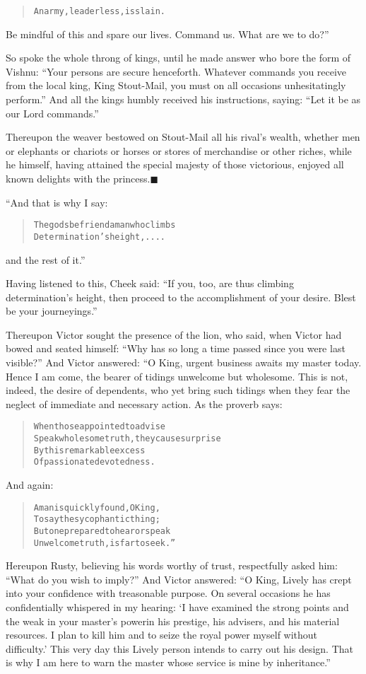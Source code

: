 \documentclass[article, twoside, 14pt]{memoir}
\newcommand{\qed}{\hfill \ensuremath{\blacksquare}}
\renewenvironment{verbatim}{%
\begin{quote}%
\vskip -10pt%
\begin{alltt}\normalfont\large}{\end{alltt}%
\end{quote}%
\vskip -10pt
} %
\begin{document}
\begin{verbatim}
An army, leaderless, is slain.
\end{verbatim}
Be mindful of this and spare our lives. Command us. What are we to
do?”

So spoke the whole throng of kings, until he made answer who bore
the form of Vishnu:
``Your persons are secure henceforth. Whatever commands you receive from the local king, King Stout-Mail, you must on all occasions unhesitatingly perform.''
And all the kings humbly received his instructions, saying:
``Let it be as our Lord commands.''

Thereupon the weaver bestowed on Stout-Mail all his rival's wealth,
whether men or elephants or chariots or horses or stores of
merchandise or other riches, while he himself, having attained the
special majesty of those victorious, enjoyed all known delights
with the princess.\hyperref[s11]{\qed}

“And that is why I say:

\begin{verbatim}
The gods befriend a man who climbs
    Determination's height, ....
\end{verbatim}
and the rest of it.”

Having listened to this, Cheek said:
``If you, too, are thus climbing determination's height, then proceed to the accomplishment of your desire. Blest be your journeyings.''

Thereupon Victor sought the presence of the lion, who said, when
Victor had bowed and seated himself:
``Why has so long a time passed since you were last visible?'' And
Victor answered: “O King, urgent business awaits my master today.
Hence I am come, the bearer of tidings unwelcome but wholesome.
This is not, indeed, the desire of dependents, who yet bring such
tidings when they fear the neglect of immediate and necessary
action. As the proverb says:

\begin{verbatim}
When those appointed to advise
Speak wholesome truth, they cause surprise
By this remarkable excess
Of passionate devotedness.
\end{verbatim}
And again:

\begin{verbatim}
A man is quickly found, O King,
To say the sycophantic thing;
But one prepared to hear or speak
Unwelcome truth, is far to seek.”
\end{verbatim}
Hereupon Rusty, believing his words worthy of trust, respectfully
asked him: ``What do you wish to imply?'' And Victor answered:
``O King, Lively has crept into your confidence with treasonable purpose. On several occasions he has confidentially whispered in my hearing: `I have examined the strong points and the weak in your master's power{\textemdash}in his prestige, his advisers, and his material resources. I plan to kill him and to seize the royal power myself without difficulty.' This very day this Lively person intends to carry out his design. That is why I am here to warn the master whose service is mine by inheritance.''
\end{document}

